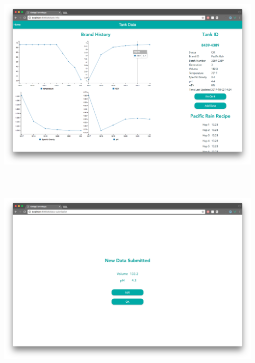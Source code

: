 \documentclass[draftclsnofoot,onecolumn,letterpaper,10pt,compsoc]{IEEEtran}
\begin{document}
\centerline{\includegraphics[height=10cm]{screenshots/desktop/tank_info.png}}
\centerline{\includegraphics[height=10cm]{screenshots/desktop/data_submission.png}}
\end{document}
